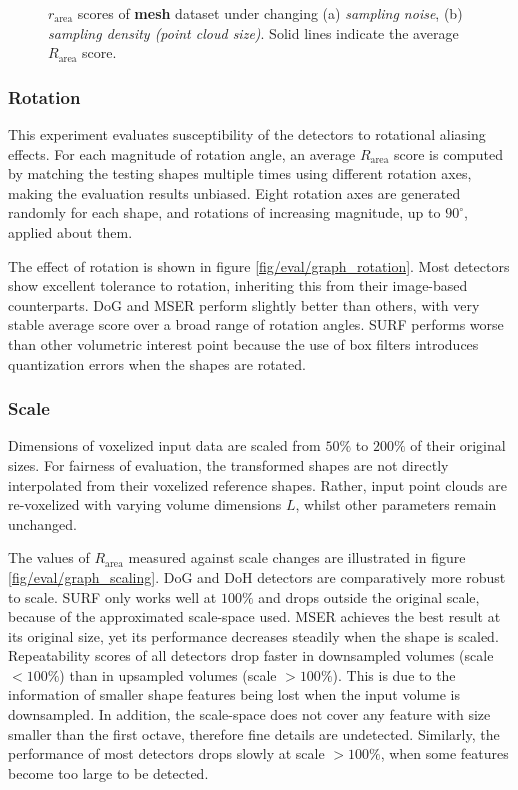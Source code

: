 \begin{figure}[ht]
\begin{subfigure}[t]{0.48\linewidth}
		\label{fig/eval/graph_sample}
	\end{subfigure}
	\caption{$r_{\textrm{area}}$ scores of \textbf{mesh} dataset under changing (a) \emph{sampling noise}, (b) \emph{sampling density (point cloud size)}. Solid lines indicate the average $R_{\textrm{area}}$ score.}
	\label{fig/eval/graph_graph0} 
\end{figure}

\subsubsection{Rotation}

This experiment evaluates susceptibility of the detectors to rotational aliasing effects. 
For each magnitude of rotation angle, an average $R_{\textrm{area}}$ score is computed by matching the testing shapes multiple times using different rotation axes, making the evaluation results unbiased. Eight rotation axes are generated randomly for each shape, and rotations of increasing magnitude, up to $90^\circ$, applied about them. 

The effect of rotation is shown in figure \ref{fig/eval/graph_rotation}. Most detectors show excellent tolerance to rotation, inheriting this from their image-based counterparts. 
DoG and MSER perform slightly better than others, with very stable average score over a broad range of rotation angles. SURF performs worse than other volumetric interest point because the use of box filters introduces quantization errors when the shapes are rotated.

\subsubsection{Scale}

Dimensions of voxelized input data are scaled from $50\%$ to $200\%$ of their original sizes. For fairness of evaluation, the transformed shapes are not directly interpolated from their voxelized reference shapes. Rather, input point clouds are re-voxelized with varying volume dimensions $L$, whilst other parameters remain unchanged. 

The values of $R_{\textrm{area}}$ measured against scale changes are illustrated in figure \ref{fig/eval/graph_scaling}. DoG and DoH detectors are comparatively more robust to scale. SURF only works well at $100\%$ and drops outside the original scale, because of the approximated scale-space used. MSER achieves the best result at its original size, yet its performance decreases steadily when the shape is scaled.
Repeatability scores of all detectors drop faster in downsampled volumes (scale $< 100\%$) than in upsampled volumes (scale $> 100\%$). 
This is due to the information of smaller shape features being lost when the input volume is downsampled. In addition, the scale-space does not cover any feature with size smaller than the first octave, therefore fine details are undetected.  
Similarly, the performance of most detectors drops slowly at scale $> 100\%$, when some features become too large to be detected. 

